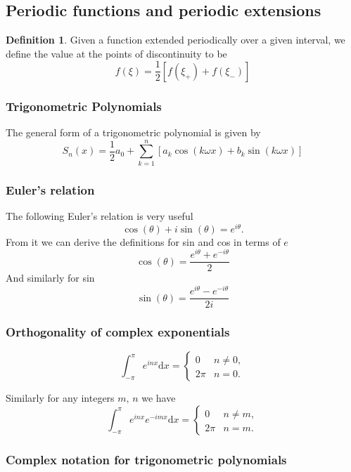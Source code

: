 \documentclass[11pt,a4paper]{article}
\newcommand\dee{\text{d}}
\theoremstyle{definition}
\newtheorem{definition}{Definition}
\begin{document}
\subsection{Periodic functions and periodic extensions}

\begin{definition}
    Given a function extended periodically over a given interval, we define the value at the points of discontinuity to be 
    \[ f(\xi) = \frac{1}{2}\left[f(\xi_+) + f(\xi_-)\right]\]
\end{definition}

\subsubsection{Trigonometric Polynomials}

The general form of a trigonometric polynomial is given by 
\[ S_n(x) = \frac{1}{2} a_0 + \sum_{k = 1}^n \left[a_k \cos(k\omega x) + b_k \sin(k\omega x)\right]\]

\subsubsection{Euler's relation}

The following Euler's relation is very useful
\[ \cos (\theta) + i \sin (\theta) = e^{i\theta}.\]
From it we can derive the definitions for sin and cos in terms of $ e $
\[ \cos(\theta) = \frac{e^{i\theta} + e^{-i\theta}}{2}\]
And similarly for sin
\[ \sin(\theta) = \frac{e^{i\theta} - e^{-i\theta}}{2i}\]

\subsubsection{Orthogonality of complex exponentials} 

\[ \int_{-\pi}^\pi e^{inx} \dee x = \begin{cases}
    0  & n \neq 0, \\
    2\pi & n = 0.
\end{cases}\]

Similarly  for any integers $ m, \, n $ we have
\[ \int_{-\pi}^\pi e^{inx}e^{-imx} \dee x = \begin{cases}
    0  & n \neq m, \\
    2\pi & n = m.
\end{cases}\]

\subsubsection{Complex notation for trigonometric polynomials}
\end{document}
